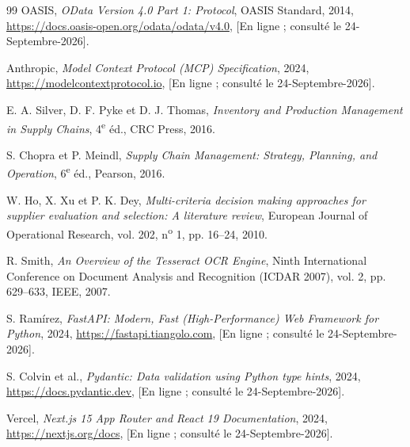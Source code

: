 \begin{thebibliography}{99}
 OASIS, \textit{OData Version 4.0 Part 1: Protocol}, OASIS Standard, 2014, \href{https://docs.oasis-open.org/odata/odata/v4.0}{https://docs.oasis-open.org/odata/odata/v4.0}, [En ligne ; consult\'{e} le 24-Septembre-2026].

 Anthropic, \textit{Model Context Protocol (MCP) Specification}, 2024, \href{https://modelcontextprotocol.io}{https://modelcontextprotocol.io}, [En ligne ; consult\'{e} le 24-Septembre-2026].

 E. A. Silver, D. F. Pyke et D. J. Thomas, \textit{Inventory and Production Management in Supply Chains}, 4\textsuperscript{e} \'{e}d., CRC Press, 2016.

 S. Chopra et P. Meindl, \textit{Supply Chain Management: Strategy, Planning, and Operation}, 6\textsuperscript{e} \'{e}d., Pearson, 2016.

 W. Ho, X. Xu et P. K. Dey, \textit{Multi-criteria decision making approaches for supplier evaluation and selection: A literature review}, European Journal of Operational Research, vol. 202, n\textsuperscript{o} 1, pp. 16--24, 2010.

 R. Smith, \textit{An Overview of the Tesseract OCR Engine}, Ninth International Conference on Document Analysis and Recognition (ICDAR 2007), vol. 2, pp. 629--633, IEEE, 2007.

 S. Ram\'{i}rez, \textit{FastAPI: Modern, Fast (High-Performance) Web Framework for Python}, 2024, \href{https://fastapi.tiangolo.com}{https://fastapi.tiangolo.com}, [En ligne ; consult\'{e} le 24-Septembre-2026].

 S. Colvin et al., \textit{Pydantic: Data validation using Python type hints}, 2024, \href{https://docs.pydantic.dev}{https://docs.pydantic.dev}, [En ligne ; consult\'{e} le 24-Septembre-2026].

 Vercel, \textit{Next.js 15 App Router and React 19 Documentation}, 2024, \href{https://nextjs.org/docs}{https://nextjs.org/docs}, [En ligne ; consult\'{e} le 24-Septembre-2026].

\end{thebibliography}